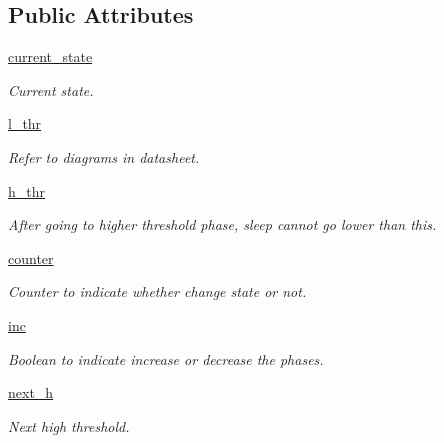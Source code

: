 \subsection*{Public Attributes}
\begin{DoxyCompactItemize}
\item 
\mbox{\hyperlink{class_analyse_sleep_1_1_analyse_sleep_ac528b9ebfd3490049266f1b56996909d}{current\+\_\+state}}
\begin{DoxyCompactList}\small\item\em Current state. \end{DoxyCompactList}\item 
\mbox{\hyperlink{class_analyse_sleep_1_1_analyse_sleep_a5b1f84d0061b93d14c5ff653c50fecd9}{l\+\_\+thr}}
\begin{DoxyCompactList}\small\item\em Refer to diagrams in datasheet. \end{DoxyCompactList}\item 
\mbox{\hyperlink{class_analyse_sleep_1_1_analyse_sleep_a5cdfaa0e9ec83e31e62c087c5c99d52c}{h\+\_\+thr}}
\begin{DoxyCompactList}\small\item\em After going to higher threshold phase, sleep cannot go lower than this. \end{DoxyCompactList}\item 
\mbox{\hyperlink{class_analyse_sleep_1_1_analyse_sleep_aa8260b640012bb57798435f5d29fb411}{counter}}
\begin{DoxyCompactList}\small\item\em Counter to indicate whether change state or not. \end{DoxyCompactList}\item 
\mbox{\hyperlink{class_analyse_sleep_1_1_analyse_sleep_a7f6d8ac2a8055df61a58a5f7aeca59a8}{inc}}
\begin{DoxyCompactList}\small\item\em Boolean to indicate increase or decrease the phases. \end{DoxyCompactList}\item 
\mbox{\hyperlink{class_analyse_sleep_1_1_analyse_sleep_af4fdb6c697e7a269a49a761402aeb497}{next\+\_\+h}}
\begin{DoxyCompactList}\small\item\em Next high threshold. \end{DoxyCompactList}\end{DoxyCompactItemize}
